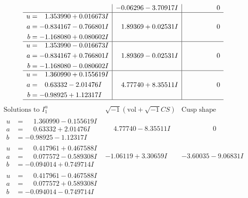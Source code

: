 \documentclass[1p]{elsarticle_modified}
\theoremstyle{definition}
\newcommand{\I}{\sqrt{-1}}
\begin{document}
$$\begin{array}{c|c|c}
 & -0.06296 - 3.70917 I & \phantom{-0.000000 } 0 \\ \hline\begin{aligned}
u &= \phantom{-}1.353990 + 0.016673 I \\
a &= -0.834167 - 0.766801 I \\
b &= -1.168080 + 0.080602 I\end{aligned}
 & \phantom{-}1.89369 + 0.02531 I & \phantom{-0.000000 } 0 \\ \hline\begin{aligned}
u &= \phantom{-}1.353990 - 0.016673 I \\
a &= -0.834167 + 0.766801 I \\
b &= -1.168080 - 0.080602 I\end{aligned}
 & \phantom{-}1.89369 - 0.02531 I & \phantom{-0.000000 } 0 \\ \hline\begin{aligned}
u &= \phantom{-}1.360990 + 0.155619 I \\
a &= \phantom{-}0.63332 - 2.01476 I \\
b &= -0.98925 + 1.12317 I\end{aligned}
 & \phantom{-}4.77740 + 8.35511 I & \phantom{-0.000000 } 0\\
 \hline 
 \end{array}$$\newpage$$\begin{array}{c|c|c}  
\text{Solutions to }I^u_{1}& \I (\text{vol} + \sqrt{-1}CS) & \text{Cusp shape}\\
 \hline 
\begin{aligned}
u &= \phantom{-}1.360990 - 0.155619 I \\
a &= \phantom{-}0.63332 + 2.01476 I \\
b &= -0.98925 - 1.12317 I\end{aligned}
 & \phantom{-}4.77740 - 8.35511 I & \phantom{-0.000000 } 0 \\ \hline\begin{aligned}
u &= \phantom{-}0.417961 + 0.467588 I \\
a &= \phantom{-}0.077572 - 0.589308 I \\
b &= -0.094014 + 0.749714 I\end{aligned}
 & -1.06119 + 3.30659 I & -3.60035 - 9.06831 I \\ \hline\begin{aligned}
u &= \phantom{-}0.417961 - 0.467588 I \\
a &= \phantom{-}0.077572 + 0.589308 I \\
b &= -0.094014 - 0.749714 I\end{aligned}

\end{array}$$
\end{document}

